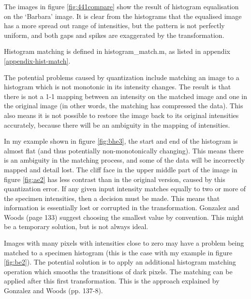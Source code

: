 \documentclass[a4paper]{article}
\begin{document}
The images in figure \ref{fig:441compare} show the result of histogram equalisation on the `Barbara' image. It is clear from the histograms that the equalised image has a more spread out range of intensities, but the pattern is not perfectly uniform, and both gaps and spikes are exaggerated by the transformation.

Histogram matching is defined in histogram\_match.m, as listed in appendix \ref{appendix-hist-match}. 

The potential problems caused by quantization include matching an image to a histogram which is not monotonic in its intensity changes. The result is that there is not a 1-1 mapping between an intensity on the matched image and one in the original image (in other words, the matching has compressed the data). This also means it is not possible to restore the image back to its original intensities accurately, because there will be an ambiguity in the mapping of intensities. 

In my example shown in figure \ref{fig:bhe3}, the start and end of the histogram is almost flat (and thus potentially non-monotonically changing). This means there is an ambiguity in the matching process, and some of the data will be incorrectly mapped and detail lost. The cliff face in the upper middle part of the image in figure \ref{fig:ae2} has less contrast than in the original version, caused by this quantization error.
If any given input intensity matches equally to two or more of the specimen intensities, then a decision must be made. This means that information is essentially lost or corrupted in the transformation. Gonzalez and Woods (page 133) suggest choosing the smallest value by convention. This might be a temporary solution, but is not always ideal.

Images with many pixels with intensities close to zero may have a problem being matched to a specimen histogram (this is the case with my example in figure \ref{fig:be2}). The potential solution is to apply an additional histogram matching operation which smooths the transitions of dark pixels. The matching can be applied after this first transformation. This is the approach explained by Gonzalez and Woods (pp. 137-8).
\end{document}
